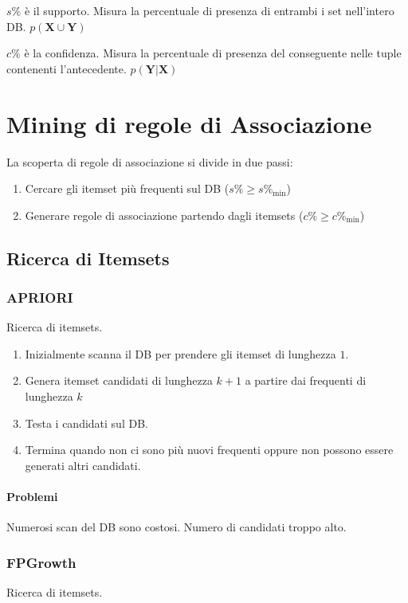 \documentclass[11pt,onecolumn,a4paper,oneside]{book}
\begin{document}
	$s\%$ è il supporto. Misura la percentuale di presenza di entrambi i set nell'intero DB. $p(\textbf{X} \cup \textbf{Y})$
	
	$c\%$ è la confidenza. Misura la percentuale di presenza del conseguente nelle tuple contenenti l'antecedente. $p( \textbf{Y} | \textbf{X} )$
	
	\section{Mining di regole di Associazione}
La scoperta di regole di associazione si divide in due passi:
\begin{enumerate}
\item Cercare gli itemset più frequenti sul DB ($s\% \geq s\%_{\min}$)
\item Generare regole di associazione partendo dagli itemsets ($c\% \geq c\%_{\min}$)
\end{enumerate}
	
\subsection{Ricerca di Itemsets}

\subsubsection{APRIORI}
Ricerca di itemsets.

\begin{enumerate}
\item Inizialmente scanna il DB per prendere gli itemset di lunghezza $1$.

\item Genera itemset candidati	di lunghezza $k+1$ a partire dai frequenti di lunghezza $k$

\item Testa i candidati sul DB.

\item Termina quando non ci sono più nuovi frequenti oppure non possono essere generati altri candidati.
\end{enumerate}

\paragraph{Problemi}
Numerosi scan del DB sono costosi. Numero di candidati troppo alto.
		
		\subsubsection{FPGrowth}
Ricerca di itemsets.
\end{document}
